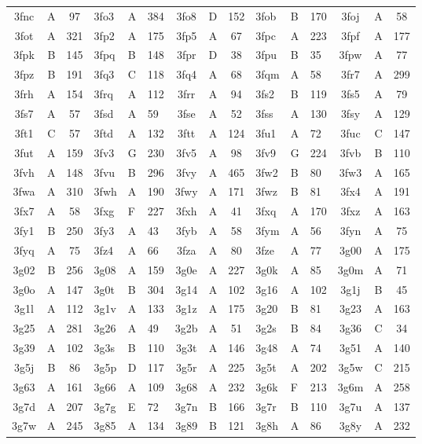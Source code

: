 \begin{longtable}{|c|c|c| a|a|a| c|c|c| a|a|a| c|c|c|}
3fnc & A & 97 & 3fo3 & A & 384 & 3fo8 & D & 152 & 3fob & B & 170 & 3foj & A & 58\\
3fot & A & 321 & 3fp2 & A & 175 & 3fp5 & A & 67 & 3fpc & A & 223 & 3fpf & A & 177\\
3fpk & B & 145 & 3fpq & B & 148 & 3fpr & D & 38 & 3fpu & B & 35 & 3fpw & A & 77\\
3fpz & B & 191 & 3fq3 & C & 118 & 3fq4 & A & 68 & 3fqm & A & 58 & 3fr7 & A & 299\\
3frh & A & 154 & 3frq & A & 112 & 3frr & A & 94 & 3fs2 & B & 119 & 3fs5 & A & 79\\
3fs7 & A & 57 & 3fsd & A & 59 & 3fse & A & 52 & 3fss & A & 130 & 3fsy & A & 129\\
3ft1 & C & 57 & 3ftd & A & 132 & 3ftt & A & 124 & 3fu1 & A & 72 & 3fuc & C & 147\\
3fut & A & 159 & 3fv3 & G & 230 & 3fv5 & A & 98 & 3fv9 & G & 224 & 3fvb & B & 110\\
3fvh & A & 148 & 3fvu & B & 296 & 3fvy & A & 465 & 3fw2 & B & 80 & 3fw3 & A & 165\\
3fwa & A & 310 & 3fwh & A & 190 & 3fwy & A & 171 & 3fwz & B & 81 & 3fx4 & A & 191\\
3fx7 & A & 58 & 3fxg & F & 227 & 3fxh & A & 41 & 3fxq & A & 170 & 3fxz & A & 163\\
3fy1 & B & 250 & 3fy3 & A & 43 & 3fyb & A & 58 & 3fym & A & 56 & 3fyn & A & 75\\
3fyq & A & 75 & 3fz4 & A & 66 & 3fza & A & 80 & 3fze & A & 77 & 3g00 & A & 175\\
3g02 & B & 256 & 3g08 & A & 159 & 3g0e & A & 227 & 3g0k & A & 85 & 3g0m & A & 71\\
3g0o & A & 147 & 3g0t & B & 304 & 3g14 & A & 102 & 3g16 & A & 102 & 3g1j & B & 45\\
3g1l & A & 112 & 3g1v & A & 133 & 3g1z & A & 175 & 3g20 & B & 81 & 3g23 & A & 163\\
3g25 & A & 281 & 3g26 & A & 49 & 3g2b & A & 51 & 3g2s & B & 84 & 3g36 & C & 34\\
3g39 & A & 102 & 3g3s & B & 110 & 3g3t & A & 146 & 3g48 & A & 74 & 3g51 & A & 140\\
3g5j & B & 86 & 3g5p & D & 117 & 3g5r & A & 225 & 3g5t & A & 202 & 3g5w & C & 215\\
3g63 & A & 161 & 3g66 & A & 109 & 3g68 & A & 232 & 3g6k & F & 213 & 3g6m & A & 258\\
3g7d & A & 207 & 3g7g & E & 72 & 3g7n & B & 166 & 3g7r & B & 110 & 3g7u & A & 137\\
3g7w & A & 245 & 3g85 & A & 134 & 3g89 & B & 121 & 3g8h & A & 86 & 3g8y & A & 232\\

\end{longtable}
